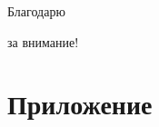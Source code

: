\documentclass[10pt]{beamer}
\begin{document}
\begin{frame}
\Huge{\centerline{\color{blue} Благодарю}
\centerline{\color{blue} 
за внимание!}}
\end{frame}

\appendix
\section{Приложение}
\end{document}
